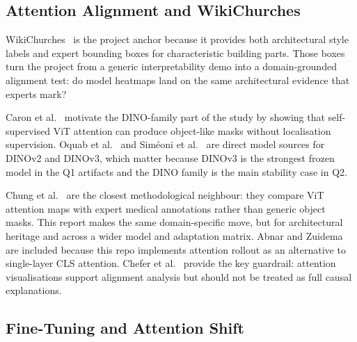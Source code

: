 \documentclass{article}
\begin{document}
\subsection{Attention Alignment and WikiChurches}

WikiChurches~\cite{Barz21WikiChurches} is the project anchor because it
provides both architectural style labels and expert bounding boxes for
characteristic building parts. Those boxes turn the project from a generic
interpretability demo into a domain-grounded alignment test: do model heatmaps
land on the same architectural evidence that experts mark?

Caron et al.~\cite{Caron21DINO} motivate the DINO-family part of the study by
showing that self-supervised ViT attention can produce object-like masks without
localisation supervision. Oquab et al.~\cite{Oquab24DINOv2} and Sim\'{e}oni et
al.~\cite{Simeoni25DINOv3} are direct model sources for DINOv2 and DINOv3,
which matter because DINOv3 is the strongest frozen model in the Q1 artifacts
and the DINO family is the main stability case in Q2.

Chung et al.~\cite{Chung25MedViT} are the closest methodological neighbour:
they compare ViT attention maps with expert medical annotations rather than
generic object masks. This report makes the same domain-specific move, but for
architectural heritage and across a wider model and adaptation matrix.
Abnar and Zuidema~\cite{Abnar20Rollout} are included because this repo
implements attention rollout as an alternative to single-layer CLS attention.
Chefer et al.~\cite{Chefer21Interp} provide the key guardrail: attention
visualisations support alignment analysis but should not be treated as full
causal explanations.

\subsection{Fine-Tuning and Attention Shift}
\end{document}
